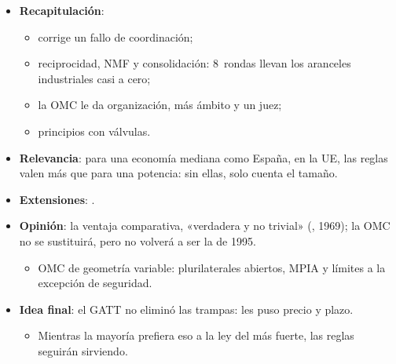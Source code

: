 \documentclass{article}
\begin{document}
\begin{columnas}
\begin{itemize}
\item \textbf{Recapitulación}:
  \begin{itemize}
  \item corrige un fallo de coordinación;
  \item reciprocidad, NMF y consolidación: 8~rondas llevan los aranceles industriales casi a cero;
  \item la OMC le da organización, más ámbito y un juez;
  \item principios con válvulas.
  \end{itemize}
\item \textbf{Relevancia}: para una economía mediana como España, en la UE, las reglas valen más que para una potencia: sin ellas, solo cuenta el tamaño.
\item \textbf{Extensiones}:      .
\item \textbf{Opinión}: la ventaja comparativa, «verdadera y no trivial» (, 1969); la OMC no se sustituirá, pero no volverá a ser la de 1995.
  \begin{itemize}
  \item OMC de geometría variable: plurilaterales abiertos, MPIA y límites a la excepción de seguridad.
  \end{itemize}
\item \textbf{Idea final}: el GATT no eliminó las trampas: les puso precio y plazo.
  \begin{itemize}
  \item Mientras la mayoría prefiera eso a la ley del más fuerte, las reglas seguirán sirviendo.
  \end{itemize}
\end{itemize}


\end{columnas}
\end{document}
